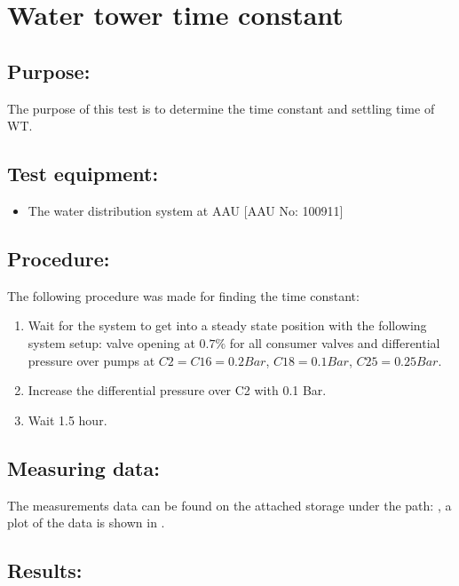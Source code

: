 \section{Water tower time constant}
\label{sec:WT_TimeConstant}

\subsection*{Purpose:}
The purpose of this test is to determine the time constant and settling time of WT.


\subsection*{Test equipment:}
\begin{itemize}
\item The water distribution system at AAU [AAU No: 100911]
\end{itemize}

\subsection*{Procedure:}
The following procedure was made for finding the time constant:
\begin{enumerate}
\item Wait for the system to get into a steady state position with the following system setup: valve opening at $0.7 \%$ for all consumer valves and differential pressure over pumps at $C2 = C16 = 0.2 Bar$, $C18 = 0.1 Bar$, $C25 = 0.25 Bar$.
\item Increase the differential pressure over C2 with 0.1 Bar.
\item Wait 1.5 hour.
\end{enumerate}


\subsection*{Measuring data:}
The measurements data can be found on the attached storage under the path: , a plot of the data is shown in .

\subsection*{Results:}

